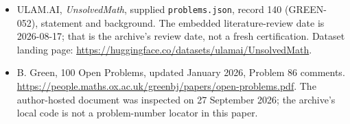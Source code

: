 \documentclass[11pt,a4paper]{article}
\begin{document}
{\small

\begin{itemize}

\item[\hypertarget{source:140:1}{S1}] ULAM.AI, \emph{UnsolvedMath}, supplied \texttt{problems.json}, record 140 (GREEN-052), statement and background. The embedded literature-review date is 2026-08-17; that is the archive’s review date, not a fresh certification. Dataset landing page: \url{https://huggingface.co/datasets/ulamai/UnsolvedMath}.

\item[\hypertarget{source:140:2}{S2}] B. Green, 100 Open Problems, updated January 2026, Problem 86 comments. \url{https://people.maths.ox.ac.uk/greenbj/papers/open-problems.pdf}. The author-hosted document was inspected on 27 September 2026; the archive’s local code is not a problem-number locator in this paper.

\end{itemize}

}

\label{end:140}
\end{document}
